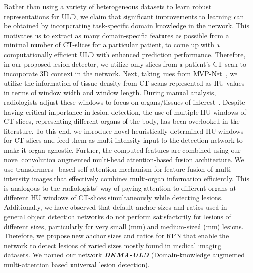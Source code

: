\documentclass{bmvc2k}
\begin{document}
Rather than using a variety of heterogeneous datasets to learn robust representations for ULD, we claim that significant improvements to learning can be obtained by incorporating task-specific domain knowledge in the network. This motivates us to extract as many domain-specific features as possible from a minimal number of CT-slices for a particular patient, to come up with a computationally efficient ULD with enhanced prediction performance. Therefore, in our proposed lesion detector, we utilize only  slices from a patient's CT scan to incorporate 3D context in the network. Next, taking cues from MVP-Net~\cite{li2019mvp}, we utilize the information of tissue density from CT-scans represented as HU-values in terms of window width and window length. During manual analysis, radiologists adjust these windows to focus on organs/tissues of interest~\cite{bae2005ct}. Despite having critical importance in lesion detection, the use of multiple HU windows of CT-slices, representing different organs of the body, has been overlooked in the literature. To this end, we introduce  novel heuristically determined HU windows for CT-slices and feed them as multi-intensity input to the detection network to make it organ-agnostic. Further, the computed features are combined using our novel convolution augmented multi-head attention-based fusion architecture. We use transformers~\cite{attentionisallyouneed, ViT, detr} based self-attention mechanism for feature-fusion of multi-intensity images that effectively combines multi-organ information efficiently. This is analogous to the radiologists' way of paying attention to different organs at different HU windows of CT-slices simultaneously while detecting lesions. Additionally, we have observed that default anchor sizes and ratios used in general object detection networks do not perform satisfactorily for lesions of different sizes, particularly for very small (mm) and medium-sized (mm) lesions. Therefore, we propose new anchor sizes and ratios for RPN that enable the network to detect lesions of varied sizes mostly found in medical imaging datasets. We named our network \textbf{\emph{DKMA-ULD}} (Domain-knowledge augmented multi-attention based universal lesion detection).
\end{document}
